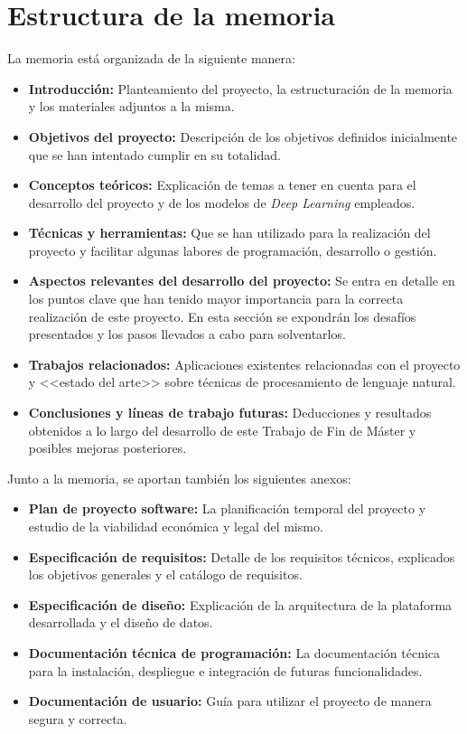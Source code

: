 \section{Estructura de la memoria}

La memoria está organizada de la siguiente manera:

\begin{itemize}
    \item \textbf{Introducción:} Planteamiento del proyecto, la estructuración de la memoria y los materiales adjuntos a la misma.
    \item \textbf{Objetivos del proyecto:} Descripción de los objetivos definidos inicialmente que se han intentado cumplir en su totalidad.
    \item \textbf{Conceptos teóricos:} Explicación de temas a tener en cuenta para el desarrollo del proyecto y de los modelos de \textit{Deep Learning} empleados.
    \item \textbf{Técnicas y herramientas:} Que se han utilizado para la realización del proyecto y facilitar algunas labores de programación, desarrollo o gestión.
    \item \textbf{Aspectos relevantes del desarrollo del proyecto:} Se entra en detalle en los puntos clave que han tenido mayor importancia para la correcta realización de este proyecto. En esta sección se expondrán los desafíos presentados y los pasos llevados a cabo para solventarlos.
    \item \textbf{Trabajos relacionados:} Aplicaciones existentes relacionadas con el proyecto y <<estado del arte>> sobre técnicas de procesamiento de lenguaje natural.
    \item \textbf{Conclusiones y líneas de trabajo futuras:} Deducciones y resultados obtenidos a lo largo del desarrollo de este Trabajo de Fin de Máster y posibles mejoras posteriores.
\end{itemize}

Junto a la memoria, se aportan también los siguientes anexos:

\begin{itemize}
    \item \textbf{Plan de proyecto software:} La planificación temporal del proyecto y estudio de la viabilidad económica y legal del mismo.
    \item \textbf{Especificación de requisitos:} Detalle de los requisitos técnicos, explicados los objetivos generales y el catálogo de requisitos.
    \item \textbf{Especificación de diseño:} Explicación de la arquitectura de la plataforma desarrollada y el diseño de datos.
    \item \textbf{Documentación técnica de programación:} La documentación técnica para la instalación, despliegue e integración de futuras funcionalidades.
    \item \textbf{Documentación de usuario:} Guía para utilizar el proyecto de manera segura y correcta.
\end{itemize}

